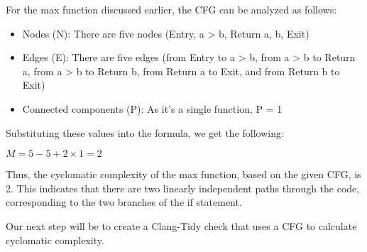 For the max function discussed earlier, the CFG can be analyzed as follows:

\begin{itemize}
\item
Nodes (N): There are five nodes (Entry, a > b, Return a, b, Exit)

\item
Edges (E): There are five edges (from Entry to a > b, from a > b to Return a, from a > b to Return b, from Return a to Exit, and from Return b to Exit)

\item
Connected components (P): As it's a single function, P = 1
\end{itemize}

Substituting these values into the formula, we get the following:

$ M = 5 − 5 + 2 × 1 = 2$

Thus, the cyclomatic complexity of the max function, based on the given CFG, is 2. This indicates that there are two linearly independent paths through the code, corresponding to the two branches of the if statement.

Our next step will be to create a Clang-Tidy check that uses a CFG to calculate cyclomatic complexity.





































